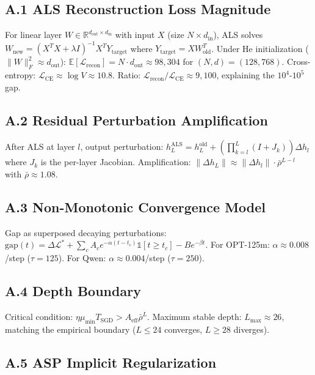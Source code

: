 \documentclass[11pt]{article}
\begin{document}
\subsection*{A.1 ALS Reconstruction Loss Magnitude}

For linear layer $W \in \mathbb{R}^{d_{\text{out}} \times d_{\text{in}}}$ with input $X$ (size $N \times d_{\text{in}}$), ALS solves $W_{\text{new}} = (X^T X + \lambda I)^{-1} X^T Y_{\text{target}}$ where $Y_{\text{target}} = X W_{\text{old}}^T$. Under He initialization ($\|W\|_F^2 \approx d_{\text{out}}$): $\mathbb{E}[\mathcal{L}_{\text{recon}}] = N \cdot d_{\text{out}} \approx 98,304$ for $(N,d) = (128, 768)$. Cross-entropy: $\mathcal{L}_{\text{CE}} \approx \log V \approx 10.8$. Ratio: $\mathcal{L}_{\text{recon}} / \mathcal{L}_{\text{CE}} \approx 9,100$, explaining the $10^4$-$10^5$ gap.

\subsection*{A.2 Residual Perturbation Amplification}

After ALS at layer $l$, output perturbation: $h_L^{\text{ALS}} = h_L^{\text{old}} + (\prod_{k=l}^{L} (I + J_k)) \Delta h_l$ where $J_k$ is the per-layer Jacobian. Amplification: $\|\Delta h_L\| \approx \|\Delta h_l\| \cdot \bar{\rho}^{L-l}$ with $\bar{\rho} \approx 1.08$.

\subsection*{A.3 Non-Monotonic Convergence Model}

Gap as superposed decaying perturbations: $\text{gap}(t) = \Delta\mathcal{L}^* + \sum_c A_c e^{-\alpha(t-t_c)}\mathbb{1}[t \geq t_c] - B e^{-\beta t}$. For OPT-125m: $\alpha \approx 0.008$/step ($\tau=125$). For Qwen: $\alpha \approx 0.004$/step ($\tau=250$).

\subsection*{A.4 Depth Boundary}

Critical condition: $\eta \mu_{\min} T_{\text{SGD}} > A_{\text{eff}} \bar{\rho}^L$. Maximum stable depth: $L_{\max} \approx 26$, matching the empirical boundary ($L \leq 24$ converges, $L \geq 28$ diverges).

\subsection*{A.5 ASP Implicit Regularization}
\end{document}
